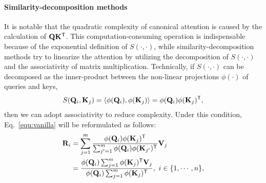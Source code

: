 \documentclass[nohyperref]{article}
\theoremstyle{plain}
\theoremstyle{definition}
\theoremstyle{remark}
\begin{document}
\paragraph{Similarity-decomposition methods} 
It is notable that the quadratic complexity of canonical attention is caused by the calculation of $\mathbf{Q}\mathbf{K}^{\sf T}$. This computation-consuming operation is indispensable because of the exponential definition of $S(\cdot,\cdot)$, while similarity-decomposition methods try to linearize the attention by utilizing the decomposition of $S(\cdot,\cdot)$ and the associativity of matrix multiplication. Technically, if $S(\cdot,\cdot)$ can be decomposed as the inner-product between the non-linear projections $\phi(\cdot)$ of queries and keys,
\begin{equation}
	\begin{split}\label{equ:kernel}
		S(\mathbf{Q}_{i},\mathbf{K}_{j})=\left<\phi(\mathbf{Q}_{i}), \phi(\mathbf{K}_{j})\right>=\phi(\mathbf{Q}_{i})\phi(\mathbf{K}_{j})^{\sf T},\\
	\end{split}
\end{equation}
then we can adopt associativity to reduce complexity. Under this condition, Eq.~\eqref{equ:vanilla} will be reformulated as follows:
\begin{equation}
	\begin{split}\label{equ:assoc}
		\mathbf{R}_{i}&=\sum_{j=1}^{m}\frac{\phi(\mathbf{Q}_{i})\phi(\mathbf{K}_{j})^{\sf T}}{\sum_{j'=1}^{m}\phi(\mathbf{Q}_{i})\phi(\mathbf{K}_{j'})^{\sf T}}\mathbf{V}_{j}\\
		&=\frac{\phi(\mathbf{Q}_{i})\sum_{j=1}^{m}\phi(\mathbf{K}_{j})^{\sf T}\mathbf{V}_{j}}{\phi(\mathbf{Q}_{i})\sum_{j=1}^{m}\phi(\mathbf{K}_{j})^{\sf T}},\ i\in\{1,\cdots,n\},\\
	\end{split}
\end{equation}
\end{document}
